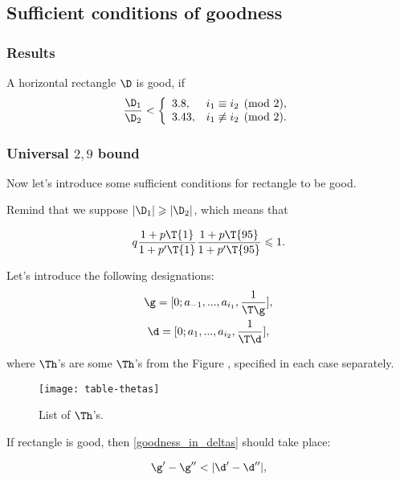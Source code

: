 \subsection{Sufficient conditions of goodness}

\subsubsection{Results}

A horizontal rectangle $\D$ is good, if
\begin{equation}\label{goodness_condition}
	\dfrac{\D_1}{\D_2} <
	\left\{\begin{array}{ll}
		3.8, & i_1 \equiv i_2 \pmod 2,\\
		3.43, & i_1 \not\equiv i_2 \pmod 2.
	\end{array}\right.
\end{equation}

\subsubsection{Universal $2,9$ bound}

Now let's introduce some sufficient conditions for rectangle to be good.

Remind that we suppose $|\D_1| \geqslant |\D_2|$, which means that

\begin{equation*}
	q
	\dfrac{1 + p \T{1}}{1 + p' \T{1}}
	\dfrac{1 + p \T{95}}{1 + p' \T{95}} \leqslant 1.
\end{equation*}

Let's introduce the following designations:
\begin{gather*}
	\g = [0; a_{-1}, ..., a_{i_1}, \frac{1}{\T\g}], \\
	\d = [0; a_{1}, ..., a_{i_2}, \frac{1}{\T\d}],
\end{gather*}

where $\Th$'s are some $\Th$'s from the Figure ,
specified in each case separately.

\begin{figure}[p]
	\texttt{[image: table-thetas]}
	\caption{List of $\Th$'s.}
	\label{fg:table-thetas}
\end{figure}

If rectangle is good, then \ref{goodness_in_deltas} should take place:

\begin{equation}\label{goodness_in_deltas}
	\g' - \g'' < |\d' - \d''|,
\end{equation}

